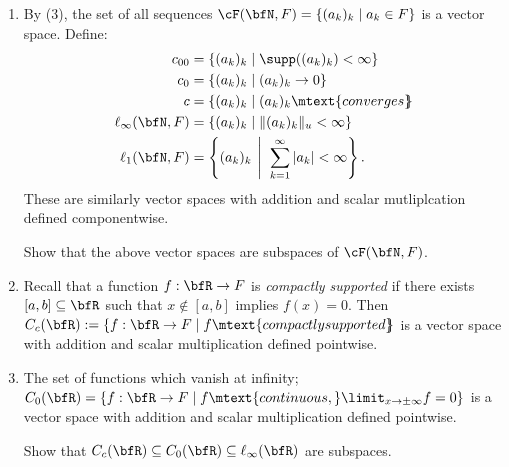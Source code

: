 \begin{example}
\begin{enumerate}[label = (\arabic*)]
            \item By (3), the set of all sequences $\cF(\bfN, F) = \{(a_k)_k \mid a_k \in F\}$ is a vector space. Define:
                \begin{equation*}
                \begin{split}
                    c_{00} & = \{(a_k)_k \mid \supp((a_k)_k) < \infty\} \\
                    c_0 & = \{(a_k)_k \mid (a_k)_k \rightarrow 0\} \\
                    c &= \{(a_k)_k \mid (a_k)_k \mtext{converges}\hspace{-4pt}\} \\
                    \ell_\infty(\bfN,F) &= \{(a_k)_k \mid \lVert (a_k)_k \rVert _u < \infty\} \\
                    \ell_1(\bfN,F) & = \left\{(a_k)_k \hspace{4pt} \Bigg|\hspace{4pt} \sum_{k = 1}^\infty |a_k| < \infty \right\}.
                \end{split}
                \end{equation*}
            These are similarly vector spaces with addition and scalar mutliplcation defined componentwise.
                \begin{exercise}\label{ex:seq-subspace}
                    Show that the above vector spaces are subspaces of $\cF(\bfN,F)$.
                \end{exercise}

            \item Recall that a function $f:\bfR \rightarrow F$ is \textit{compactly supported} if there exists $[a,b]\subseteq \bfR$ such that $x \not\in [a,b]$ implies $f(x) = 0$. Then $C_c(\bfR) := \{f:\bfR \rightarrow F \mid f \mtext{compactly supported}\hspace{-4pt}\}$ is a vector space with addition and scalar multiplication defined pointwise.
            
            \item The set of functions which vanish at infinity; \newline $C_0(\bfR) = \{f:\bfR \rightarrow F \mid f \mtext{continuous,} \limit_{x\rightarrow \pm \infty}f = 0\}$ is a vector space with addition and scalar multiplication defined pointwise.
                \begin{exercise}\label{ex:funct-subspace}
                    Show that $C_c(\bfR) \subseteq C_0(\bfR) \subseteq \ell_\infty(\bfR)$ are subspaces.
                \end{exercise}


\end{enumerate}
\end{example}
